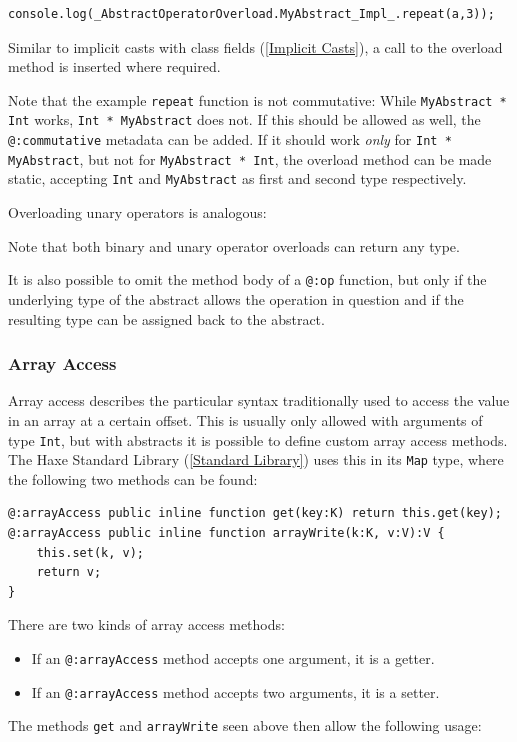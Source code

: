 \documentclass{article}
\newcommand{\type}[1]{\texttt{#1}}
\newcommand{\expr}[1]{\texttt{#1}}
\newcommand{\tref}[2]{#1 (\ref{#2})}
\newcommand{\haxe}[2][]{%
}
\begin{document}
\begin{lstlisting}
console.log(_AbstractOperatorOverload.MyAbstract_Impl_.repeat(a,3));
\end{lstlisting}
Similar to \tref{implicit casts with class fields}{Implicit Casts}, a call to the overload method is inserted where required.

Note that the example \expr{repeat} function is not commutative: While \expr{MyAbstract * Int} works, \expr{Int * MyAbstract} does not. If this should be allowed as well, the \expr{@:commutative} metadata can be added. If it should work \emph{only} for \expr{Int * MyAbstract}, but not for \expr{MyAbstract * Int}, the overload method can be made static, accepting \type{Int} and \type{MyAbstract} as first and second type respectively.

Overloading unary operators is analogous:

\haxe{assets/AbstractUnopOverload.hx}
Note that both binary and unary operator overloads can return any type.

It is also possible to omit the method body of a \expr{@:op} function, but only if the underlying type of the abstract allows the operation in question and if the resulting type can be assigned back to the abstract.

\subsubsection{Array Access}

Array access describes the particular syntax traditionally used to access the value in an array at a certain offset. This is usually only allowed with arguments of type \type{Int}, but with abstracts it is possible to define custom array access methods. The \tref{Haxe Standard Library}{Standard Library} uses this in its \type{Map} type, where the following two methods can be found:

\begin{lstlisting}
@:arrayAccess public inline function get(key:K) return this.get(key);
@:arrayAccess public inline function arrayWrite(k:K, v:V):V {
	this.set(k, v);
	return v;
}
\end{lstlisting}
There are two kinds of array access methods:

\begin{itemize}
	\item If an \expr{@:arrayAccess} method accepts one argument, it is a getter.
	\item If an \expr{@:arrayAccess} method accepts two arguments, it is a setter.
\end{itemize}
The methods \expr{get} and \expr{arrayWrite} seen above then allow the following usage:
\end{document}
